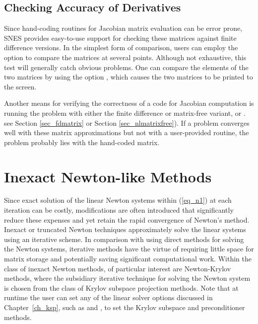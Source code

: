 \subsection{Checking Accuracy of Derivatives}
\label{sec_snesderivs}

Since hand-coding routines for Jacobian matrix evaluation
can be error prone, SNES provides easy-to-use support for checking
these matrices against finite difference versions.  In the simplest
form of comparison, users can employ the option  
to compare the matrices at several points.  Although not exhaustive,
this test will generally catch obvious problems.  One can compare the
elements of the two matrices by using the option  , which causes the two
matrices to be printed to the screen.  

Another means for verifying the correctness of a code for Jacobian
computation is running the problem with either the finite
difference or matrix-free variant,  or .
see Section \ref{sec_fdmatrix} or Section \ref{sec_nlmatrixfree}).
If a problem converges well
with these matrix approximations but not with a user-provided routine,
the problem probably lies with the hand-coded
matrix. 

\section{Inexact Newton-like Methods}

Since exact solution of the linear Newton systems within (\ref{eq_n1})
at each iteration can be costly, modifications
are often introduced that significantly reduce these expenses and
yet retain the rapid convergence of Newton's method.  Inexact or
truncated Newton techniques approximately solve the linear systems
using an iterative scheme.  In comparison with using direct methods
for solving the Newton systems, iterative methods have the virtue
of requiring little space for matrix storage and potentially saving
significant computational work.  Within the class of inexact Newton
methods, of particular interest are Newton-Krylov methods, where the
subsidiary iterative technique for solving the Newton system is
chosen from the class of Krylov subspace projection methods.
Note that at runtime the user can set any of the linear solver
options discussed in Chapter~\ref{ch_ksp}, such as
 and ,
to set the Krylov subspace and preconditioner methods.

